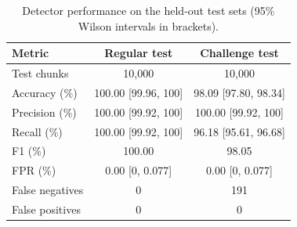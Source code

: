 \begin{table}[t]
\caption{Detector performance on the held-out test sets (95\% Wilson intervals in brackets).}
\label{tab:detector}
\centering
\begin{tabular}{lcc}
\toprule
Metric & Regular test & Challenge test \\
\midrule
Test chunks     & 10{,}000            & 10{,}000            \\
Accuracy (\%)  & 100.00 [99.96, 100] & 98.09 [97.80, 98.34] \\
Precision (\%) & 100.00 [99.92, 100] & 100.00 [99.92, 100]  \\
Recall (\%)    & 100.00 [99.92, 100] & 96.18 [95.61, 96.68] \\
F1 (\%)        & 100.00              & 98.05               \\
FPR (\%)       & 0.00 [0, 0.077]     & 0.00 [0, 0.077]     \\
False negatives & 0                   & 191                 \\
False positives & 0                   & 0                   \\
\bottomrule
\end{tabular}
\end{table}
